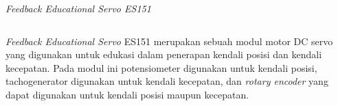 \documentclass[10pt,xcolor={dvipsnames}]{beamer}
\begin{document}
	\begin{frame}{\textit{Feedback Educational Servo ES151}}
		\begin{columns}[T] %
			\begin{column}{0.48\textwidth}
				\vspace{0.5cm}
				\justifying \textit{Feedback Educational Servo} ES151 merupakan sebuah modul motor DC servo yang digunakan untuk edukasi dalam penerapan kendali posisi dan kendali kecepatan.
				\vspace{0.5cm}
				\newline \justifying Pada modul ini potensiometer digunakan untuk kendali posisi, tachogenerator digunakan untuk kendali kecepatan, dan \textit{rotary encoder} yang dapat digunakan untuk kendali posisi maupun kecepatan. 
			\end{column}%
			\hfill%
			\begin{column}{0.48\textwidth}
				\vspace{0.5cm}
				\centering
			\end{column}
		\end{columns}
	\end{frame}
	
\end{document}
